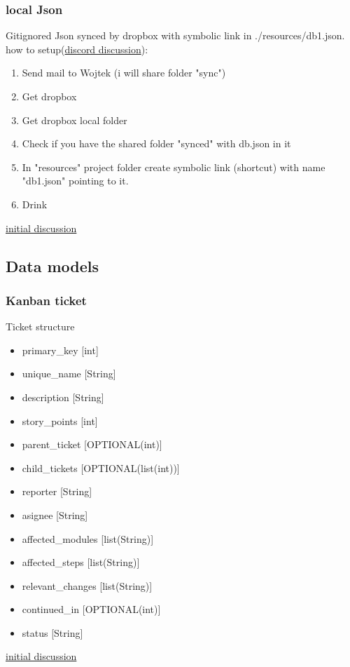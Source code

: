 \subsubsection{local Json}
Gitignored Json synced by dropbox with symbolic link in ./resources/db1.json.\\
how to setup(\href{https://discord.com/channels/892473074434310144/895768675146154004/895772874613346354}{discord discussion}):
\begin{enumerate}
    \item Send mail to Wojtek (i will share folder "sync")
    \item Get dropbox
    \item Get dropbox local folder
    \item Check if you have the shared folder "synced" with db.json in it
    \item In "resources" project folder create symbolic link (shortcut) with name "db1.json" pointing to it.
    \item Drink
\end{enumerate}

\href{https://discord.com/channels/892473074434310144/892481179624824843}{initial discussion}

\subsection{Data models}\label{MODEL:POC}
\subsubsection{Kanban ticket}
Ticket structure
\begin{itemize}
  \item primary\_key        [int]
  \item unique\_name        [String]
  \item description         [String]
  \item story\_points       [int]
  \item parent\_ticket      [OPTIONAL(int)]
  \item child\_tickets      [OPTIONAL(list(int))]
  \item reporter            [String]
  \item asignee             [String]
  \item affected\_modules   [list(String)]
  \item affected\_steps     [list(String)]
  \item relevant\_changes   [list(String)]
  \item continued\_in       [OPTIONAL(int)]
  \item status              [String]
\end{itemize}
\href{https://discord.com/channels/892473074434310144/892483718495731753}{initial discussion}

